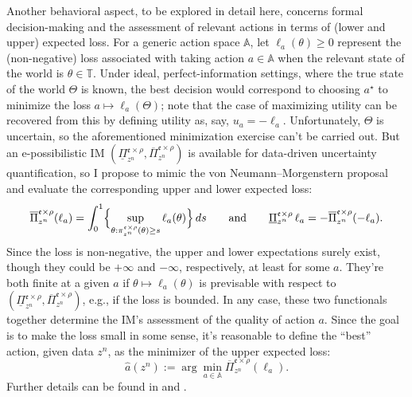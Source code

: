 \documentclass[a4paper, 12pt]{article}
\theoremstyle{plain}
\theoremstyle{definition}
\theoremstyle{remark}
\renewcommand{\AA}{\mathbb{A}}
\newcommand{\TT}{\mathbb{T}}
\newcommand{\lPi}{\underline{\Pi}}
\newcommand{\uPi}{\overline{\Pi}}
\newcommand{\eval}{\mathfrak{e}}
\begin{document}
Another behavioral aspect, to be explored in detail here, concerns formal decision-making and the assessment of relevant actions in terms of (lower and upper) expected loss.  For a generic action space $\AA$, let $\ell_a(\theta) \geq 0$ represent the (non-negative) 
loss associated with taking action $a \in \AA$ when the relevant state of the world is $\theta \in \TT$.  Under ideal, perfect-information settings, where the true state of the world $\Theta$ is known, the best decision would correspond to choosing $a^\star$ to minimize the loss $a \mapsto \ell_a(\Theta)$; note that the case of maximizing utility can be recovered from this by defining utility as, say, $u_a = -\ell_a$.  Unfortunately, $\Theta$ is uncertain, so the aforementioned minimization exercise can't be carried out.  But an e-possibilistic IM $(\lPi_{z^n}^{\eval \times \rho}, \uPi_{z^n}^{\eval \times \rho})$ is available for data-driven uncertainty quantification, so I propose to mimic the von Neumann--Morgenstern proposal and evaluate the corresponding upper and lower expected loss:
\[ \uPi_{z^n}^{\eval \times \rho}(\ell_a) = \int_0^1 \Bigl\{ \sup_{\theta: \pi_{z^n}^{\eval \times \rho}(\theta) \geq s} \ell_a(\theta) \Bigr\} \, ds \qquad \text{and} \qquad \lPi_{z^n}^{\eval \times \rho} \, \ell_a = -\uPi_{z^n}^{\eval \times \rho}(-\ell_a). \]
Since the loss is non-negative, the upper and lower expectations surely exist, though they could be $+\infty$ and $-\infty$, respectively, at least for some $a$.  They're both finite at a given $a$ if $\theta \mapsto \ell_a(\theta)$ is previsable with respect to $(\lPi_{z^n}^{\eval \times \rho}, \uPi_{z^n}^{\eval \times \rho})$, e.g., if the loss is bounded.  In any case, these two functionals together determine the IM's assessment of the quality of action $a$.  Since the goal is to make the loss small in some sense, it's reasonable to define the ``best'' action, given data $z^n$, as the minimizer of the upper expected loss:
\begin{equation}
\label{eq:a.hat}
\hat a(z^n) := \arg\min_{a \in \AA} \uPi_{z^n}^{\eval \times \rho}(\ell_a). 
\end{equation}
Further details can be found in \citet{denoeux.decision.2019} and \citet{imdec}.  
\end{document}
